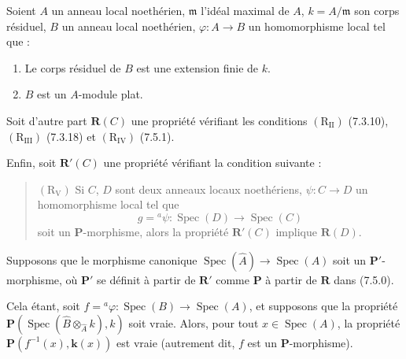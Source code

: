 \begin{corollary}[7.5.2]
\label{IV.2.s7.5.2-fr}
Soient $A$ un anneau local noethérien, $\mathfrak m$ l'idéal maximal de $A$,
$k=A/\mathfrak m$ son corps résiduel, $B$ un anneau local noethérien,
$\varphi:A\to B$ un homomorphisme local tel que :
\begin{enumerate}
\item[\emph{(i)}] Le corps résiduel de $B$ est une extension finie de $k$.
\item[\emph{(ii)}] $B$ est un $A$-module plat.
\end{enumerate}

Soit d'autre part $\boldsymbol R(C)$ une propriété vérifiant les conditions
$(\mathrm R_{\mathrm{II}})$ \textup{(7.3.10)}, $(\mathrm R_{\mathrm{III}})$
\textup{(7.3.18)} et $(\mathrm R_{\mathrm{IV}})$ \textup{(7.5.1)}.

Enfin, soit
$\boldsymbol R'(C)$ une propriété vérifiant la condition suivante :
\begin{quote}
$(\mathrm R_{\mathrm V})$ Si $C$, $D$ sont deux anneaux locaux noethériens,
$\psi:C\to D$ un homomorphisme local tel que
\[
g={}^a\psi:\operatorname{Spec}(D)\to\operatorname{Spec}(C)
\]
soit un $\boldsymbol P$-morphisme, alors la propriété
$\boldsymbol R'(C)$ implique $\boldsymbol R(D)$.
\end{quote}

Supposons que le morphisme canonique
$\operatorname{Spec}(\widehat A)\to\operatorname{Spec}(A)$ soit un
$\boldsymbol P'$-morphisme, où $\boldsymbol P'$ se définit à partir de
$\boldsymbol R'$ comme $\boldsymbol P$ à partir de $\boldsymbol R$ dans
\textup{(7.5.0)}.

Cela étant, soit
$f={}^a\varphi:\operatorname{Spec}(B)\to\operatorname{Spec}(A)$, et
supposons que la propriété
$\boldsymbol P(\operatorname{Spec}(\widehat B
\otimes_{\widehat A}k),k)$
soit vraie. Alors, pour tout $x\in\operatorname{Spec}(A)$, la propriété
$\boldsymbol P(f^{-1}(x),\boldsymbol{k}(x))$ est vraie \textup{(autrement dit,} $f$ \textup{est un}
$\boldsymbol P$-morphisme).
\end{corollary}

